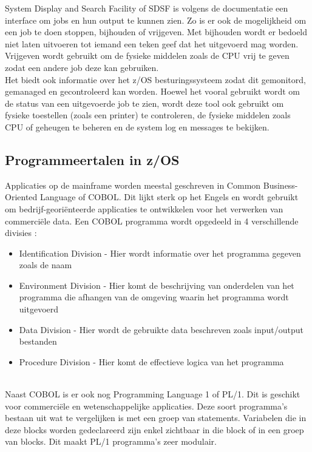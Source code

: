 System Display and Search Facility of SDSF is volgens de \textcite{IBM2023} documentatie een interface om jobs en hun output te kunnen zien. Zo is er ook de mogelijkheid om een job te doen stoppen, bijhouden of vrijgeven. Met bijhouden wordt er bedoeld niet laten uitvoeren tot iemand een teken geef dat het uitgevoerd mag worden. Vrijgeven wordt gebruikt om de fysieke middelen zoals de CPU vrij te geven zodat een andere job deze kan gebruiken. \\ 
Het biedt ook informatie over het z/OS besturingssysteem zodat dit gemonitord, gemanaged en gecontroleerd kan worden. Hoewel het vooral gebruikt wordt om de status van een uitgevoerde job te zien, wordt deze tool ook gebruikt om fysieke toestellen (zoals een printer) te controleren, de fysieke middelen zoals CPU of geheugen te beheren en de system log en messages te bekijken.

\subsection{Programmeertalen in z/OS}
Applicaties op de mainframe worden meestal geschreven in Common Business-Oriented Language of COBOL. Dit lijkt sterk op het Engels en wordt gebruikt om bedrijf-georiënteerde applicaties te ontwikkelen voor het verwerken van commerciële data. Een COBOL programma wordt opgedeeld in 4 verschillende divisies \autocite{IBMc}:
\begin{itemize}
    \item Identification Division - Hier wordt informatie over het programma gegeven zoals de naam
    \item Environment Division - Hier komt de beschrijving van onderdelen van het programma die afhangen van de omgeving waarin het programma wordt uitgevoerd
    \item Data Division - Hier wordt de gebruikte data beschreven zoals input/output bestanden
    \item Procedure Division - Hier komt de effectieve logica van het programma
\end{itemize} \\

Naast COBOL is er ook nog Programming Language 1 of PL/1. Dit is geschikt voor commerciële en wetenschappelijke applicaties. Deze soort programma's bestaan uit  wat te vergelijken is met een groep van statements. Variabelen die in deze blocks worden gedeclareerd zijn enkel zichtbaar in die block of in een groep van blocks. Dit maakt PL/1 programma's zeer modulair. \autocite{IBMc}

